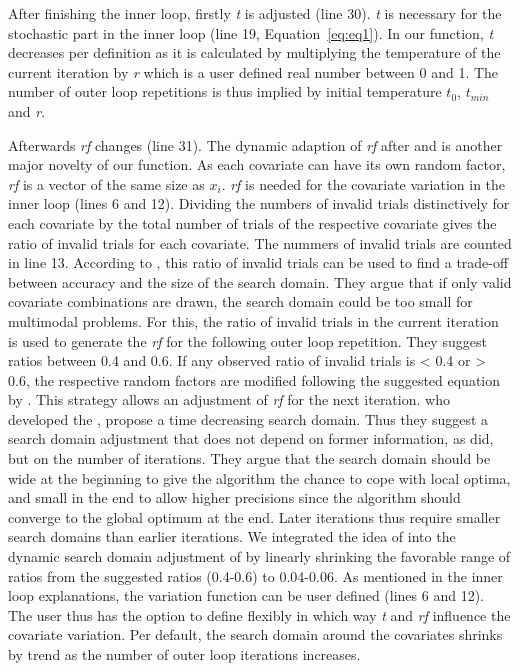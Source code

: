 After finishing the inner loop, firstly \textit{t} is adjusted (line 30).  \textit{t} is necessary for the stochastic part in the inner loop (line 19, Equation~\eqref{eq:eq1}). In our function, \textit{t} decreases per definition as it is calculated by multiplying the temperature of the current iteration by \textit{r} which is a user defined real number between 0 and 1. The number of outer loop repetitions is thus implied by initial temperature $t_0$, $t_{min}$ and \textit{r}.

Afterwards \textit{rf} changes (line 31). The dynamic adaption of \textit{rf} after \citet{corana_1987} and \citet{pronzato_1984} is another major novelty of our function. As each covariate can have its own random factor, \textit{rf} is a vector of the same size as $x_i$. \textit{rf} is needed for the covariate variation in the inner loop (lines 6 and 12). Dividing the numbers of invalid trials distinctively for each covariate by the total number of trials of the respective covariate gives the ratio of invalid trials for each covariate. The nummers of invalid trials are counted in line 13. According to \citep{corana_1987}, this ratio of invalid trials can be used to find a trade-off between accuracy and the size of the search domain. They argue that if only valid covariate combinations are drawn, the search domain could be too small for multimodal problems. For this, the ratio of invalid trials in the current iteration is used to generate the \textit{rf} for the following outer loop repetition. They suggest ratios between 0.4 and 0.6. If any observed ratio of invalid trials is < 0.4 or > 0.6, the respective random factors are modified following the suggested equation by \citet{corana_1987}. This strategy allows an adjustment of \textit{rf} for the next iteration. \citet{pronzato_1984} who developed the , propose a time decreasing search domain. Thus they suggest a search domain adjustment that does not depend on former information, as \citet{corana_1987} did, but on the number of iterations. They argue that the search domain should be wide at the beginning to give the algorithm the chance to cope with local optima, and small in the end to allow higher precisions since the algorithm should converge to the global optimum at the end. Later iterations thus require smaller search domains than earlier iterations. We integrated the idea of \citet{pronzato_1984} into the dynamic search domain adjustment of \citep{corana_1987} by linearly shrinking the favorable range of ratios from the suggested ratios (0.4-0.6) to 0.04-0.06. As mentioned in the inner loop explanations, the variation function can be user defined (lines 6 and 12). The user thus has the option to define flexibly in which way \textit{t} and \textit{rf} influence the covariate variation. Per default, the search domain around the covariates shrinks by trend as the number of outer loop iterations increases.

